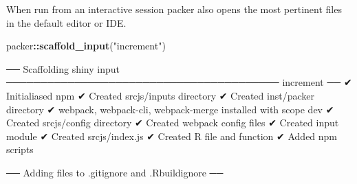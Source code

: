 \documentclass[
  10pt,
]{krantz}
\makeatletter
\newenvironment{Shaded}{\begin{snugshade}}{\end{snugshade}}
\newcommand{\ExtensionTok}[1]{#1}
\newcommand{\KeywordTok}[1]{\textcolor[rgb]{0.27,0.27,0.27}{\textbf{#1}}}
\newcommand{\NormalTok}[1]{#1}
\newcommand{\OperatorTok}[1]{\textcolor[rgb]{0.43,0.43,0.43}{\textbf{#1}}}
\newcommand{\StringTok}[1]{\textcolor[rgb]{0.5,0.5,0.5}{#1}}
\newenvironment{kframe}{%
\medskip{}
\setlength{\fboxsep}{.8em}
 \def\at@end@of@kframe{}%
 \ifinner\ifhmode%
  \def\at@end@of@kframe{\end{minipage}}%
  \begin{minipage}{\columnwidth}%
 \fi\fi%
 \def\FrameCommand##1{\hskip\@totalleftmargin \hskip-\fboxsep
 \colorbox{shadecolor}{##1}\hskip-\fboxsep
     \hskip-\linewidth \hskip-\@totalleftmargin \hskip\columnwidth}%
 \MakeFramed {\advance\hsize-\width
   \@totalleftmargin\z@ \linewidth\hsize
   \@setminipage}}%
 {\par\unskip\endMakeFramed%
 \at@end@of@kframe}
\renewenvironment{Shaded}{\begin{kframe}}{\end{kframe}}
\makeatother
\begin{document}
When run from an interactive session packer also opens the most pertinent files in the default editor or IDE.

\begin{Shaded}
\begin{Highlighting}[]
\NormalTok{packer}\OperatorTok{::}\KeywordTok{scaffold\_input}\NormalTok{(}\StringTok{"increment"}\NormalTok{)}
\end{Highlighting}
\end{Shaded}

\begin{Shaded}
\begin{Highlighting}[]
\NormalTok{── }\ExtensionTok{Scaffolding}\NormalTok{ shiny input ──────────────────────────────────────── increment ── }
\NormalTok{✔ }\ExtensionTok{Initialiased}\NormalTok{ npm}
\NormalTok{✔ }\ExtensionTok{Created}\NormalTok{ srcjs/inputs directory}
\NormalTok{✔ }\ExtensionTok{Created}\NormalTok{ inst/packer directory}
\NormalTok{✔ }\ExtensionTok{webpack}\NormalTok{, webpack{-}cli, webpack{-}merge installed with scope dev}
\NormalTok{✔ }\ExtensionTok{Created}\NormalTok{ srcjs/config directory}
\NormalTok{✔ }\ExtensionTok{Created}\NormalTok{ webpack config files}
\NormalTok{✔ }\ExtensionTok{Created} \StringTok{\textquotesingle{}input\textquotesingle{}}\NormalTok{ module}
\NormalTok{✔ }\ExtensionTok{Created}\NormalTok{ srcjs/index.js}
\NormalTok{✔ }\ExtensionTok{Created}\NormalTok{ R file and function}
\NormalTok{✔ }\ExtensionTok{Added}\NormalTok{ npm scripts}

\NormalTok{── }\ExtensionTok{Adding}\NormalTok{ files to }\StringTok{\textquotesingle{}.gitignore\textquotesingle{}}\NormalTok{ and }\StringTok{\textquotesingle{}.Rbuildignore\textquotesingle{}}\NormalTok{ ──}


\end{Highlighting}
\end{Shaded}
\end{document}
